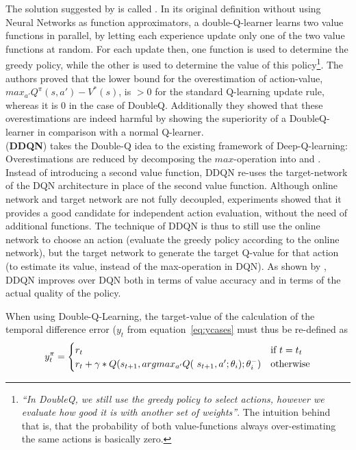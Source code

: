 The solution suggested by \cite{van_hasselt_deep_2015} is called . In its original definition without using Neural Networks as function approximators, a double-Q-learner learns two value functions in parallel, by letting each experience update only one of the two value functions at random. For each update then, one function is used to determine the greedy policy, while the other is used to determine the value of this policy\footnote{\textit{``In DoubleQ, we still use the greedy policy to select actions, however we evaluate how good it is with another set of weights''}. The intuition behind that is, that the probability of both value-functions always over-estimating the same actions is basically zero.}. The authors proved that the lower bound for the overestimation of action-value, $max_{a'}Q^\pi(s,a') - V^*(s)$, is $>0$ for the standard Q-learning update rule, whereas it is $0$ in the case of DoubleQ. Additionally they showed that these overestimations are indeed harmful by showing the superiority of a DoubleQ-learner in comparison with a normal Q-learner.\\

 (\textbf{DDQN}) takes the Double-Q idea to the existing framework of Deep-Q-learning: Overestimations are reduced by decomposing the $max$-operation into  and . Instead of introducing a second value function, DDQN re-uses the target-network of the DQN architecture in place of the second value function. Although online network and target network are not fully decoupled, experiments showed that it provides a good candidate for independent action evaluation, without the need of additional functions. The technique of DDQN is thus to still use the online network to choose an action (evaluate the greedy policy according to the online network), but the target network to generate the target Q-value for that action (to estimate its value, instead of the max-operation in DQN). As shown by \cite{van_hasselt_deep_2015}, DDQN improves over DQN both in terms of value accuracy and in terms of the actual quality of the policy. 

When using Double-Q-Learning, the target-value of the calculation of the temporal difference error ($y_t$ from equation~\ref{eq:ycases} must thus be re-defined as 
\begin{equation}
		y_t^\pi = \begin{cases} 
	r_t & \text{if } t = t_t\\
	r_t + \gamma * Q(s_{t+1}, argmax_{a'} Q($  $s_{t+1}, a'; \theta_i); \theta_i^-) & \text{otherwise} 
	\end{cases} %
\end{equation}

